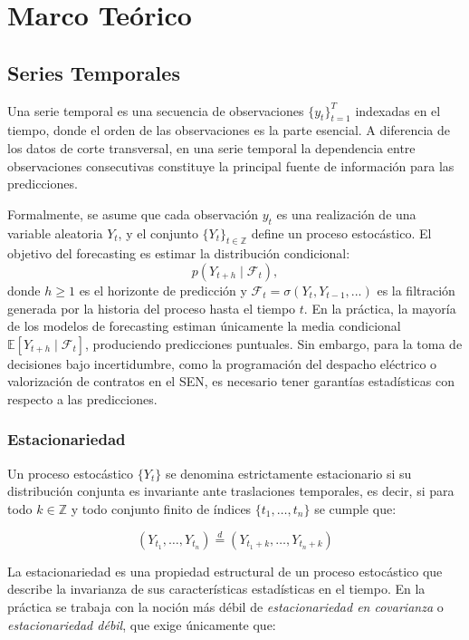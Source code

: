  \chapter{Marco Teórico}

\section{Series Temporales}

Una serie temporal es una secuencia de observaciones $\{y_t\}_{t=1}^{T}$ indexadas en el tiempo, donde el orden de las observaciones es la parte esencial. A diferencia de los datos de corte transversal, en una serie temporal la dependencia entre observaciones consecutivas constituye la principal fuente de información para las predicciones. 

Formalmente, se asume que cada observación $y_t$ es una realización de una variable aleatoria $Y_t$, y el conjunto $\{Y_t\}_{t \in \mathbb{Z}}$ define un proceso estocástico. El objetivo del forecasting es estimar la distribución condicional:
$$p(Y_{t+h} \mid \mathcal{F}_t),$$
donde $h \geq 1$ es el horizonte de predicción y $\mathcal{F}_t = \sigma(Y_t, Y_{t-1}, ...)$ es la filtración generada por la historia del proceso hasta el tiempo $t$. En la práctica, la mayoría de los modelos de forecasting estiman únicamente la media condicional $\mathbb{E}[Y_{t+h} \mid \mathcal{F}_t]$, produciendo predicciones puntuales. Sin embargo, para la toma de decisiones bajo incertidumbre, como la programación del despacho eléctrico o valorización de contratos en el SEN, es necesario tener garantías estadísticas con respecto a las predicciones.

\subsection{Estacionariedad}

Un proceso estocástico $\{Y_t\}$ se denomina estrictamente estacionario si su distribución conjunta es invariante ante traslaciones temporales, es decir, si para todo $k \in \mathbb{Z}$ y todo conjunto finito de índices $\{t_1, \ldots, t_n\}$ se cumple que:

\begin{equation}
    (Y_{t_1}, \ldots, Y_{t_n}) \overset{d}{=} (Y_{t_1+k}, \ldots, Y_{t_n+k})
\end{equation}

La estacionariedad es una propiedad estructural de un proceso estocástico que describe la invarianza de sus características estadísticas en el tiempo. En la práctica se trabaja con la noción más débil de \textit{estacionariedad en covarianza} o \textit{estacionariedad débil}, que exige únicamente que:

